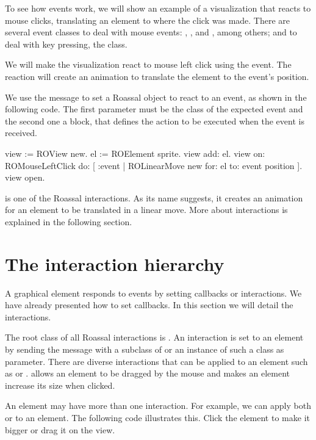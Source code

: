 \documentclass[a4paper,10pt,twoside]{book}
\begin{document}
To see how events work, we will show an example of a visualization that reacts to mouse clicks, translating an element to where the click was made. 
There are several event classes to deal with mouse events: , ,  and , among others; and to deal with key pressing, the  class.

We will make the visualization react to mouse left click using the  event. The reaction will create an animation to translate the element to the event's position.

We use the  message to set a Roassal object to react to an event, as shown in the following code. The first parameter must be the class of the expected event and the second one a block, that defines the action to be executed when the event is received.

\begin{code}{}
view := ROView new.
el := ROElement sprite.
view add: el.
view 
	on: ROMouseLeftClick 
	do: [ :event | ROLinearMove new for: el to: event position ].
view open. 
\end{code}


 is one of the Roassal interactions. As its name suggests, it creates an animation for an element to be translated in a linear move. More about interactions is explained in the following section.

\section{The interaction hierarchy} 
A graphical element responds to events by setting callbacks or interactions. We have already presented how to set callbacks. In this section we will detail the interactions. 

The root class of all Roassal interactions is . An interaction is set to an element by sending the  message with a subclass of  or an instance of such a class as parameter. There are diverse interactions that can be applied to an element such as    or .
 allows an element to be dragged by the mouse and  makes an element increase its size when clicked. 

An element may have more than one interaction. For example, we can apply both   or  to an element.
The following code illustrates this. Click the element to make it bigger or drag it on the view.
\end{document}
